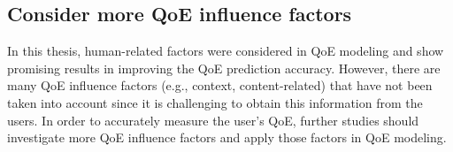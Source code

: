 \subsection{Consider more QoE influence factors}

In this thesis, human-related factors were considered in QoE modeling and show promising results in improving the QoE prediction accuracy.
However, there are many QoE influence factors (e.g., context, content-related) that have not been taken into account since it is challenging to obtain this information from the users. In order to accurately measure the user's QoE, further studies should investigate more QoE influence factors and apply those factors in QoE modeling.